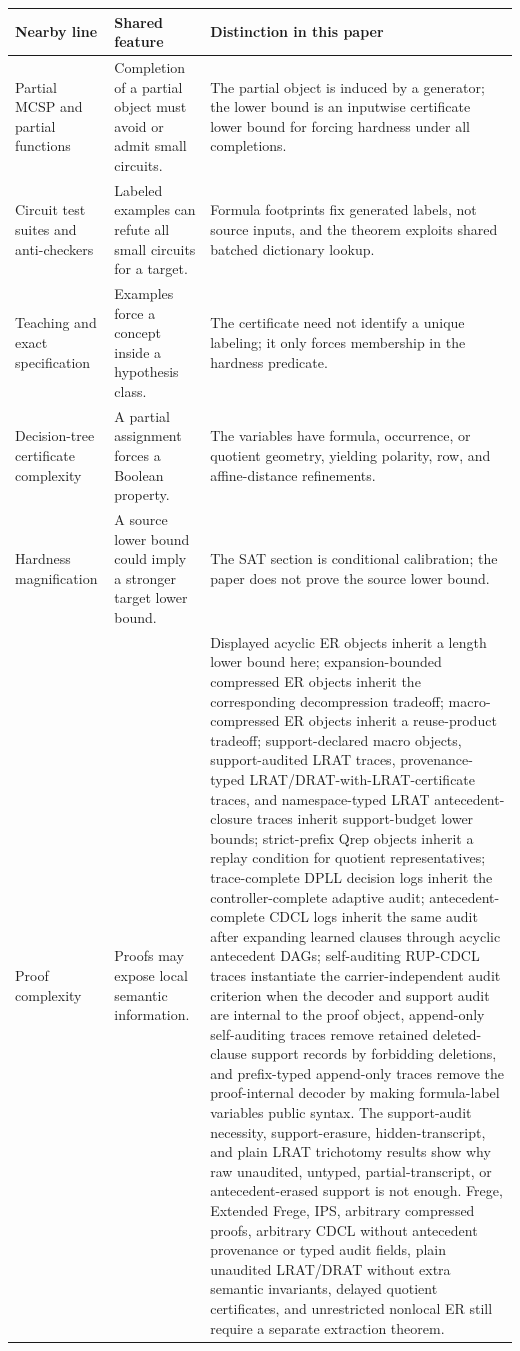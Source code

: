 \documentclass[11pt]{article}
\theoremstyle{definition}
\begin{document}
\begin{table}[htbp]
\centering
\scriptsize
\begin{tabularx}{\textwidth}{@{}p{}p{}X@{}}
\toprule
Nearby line & Shared feature & Distinction in this paper \\
\midrule
Partial MCSP and partial functions & Completion of a partial object must avoid or admit small circuits. & The partial object is induced by a generator; the lower bound is an inputwise certificate lower bound for forcing hardness under all completions. \\
Circuit test suites and anti-checkers & Labeled examples can refute all small circuits for a target. & Formula footprints fix generated labels, not source inputs, and the theorem exploits shared batched dictionary lookup. \\
Teaching and exact specification & Examples force a concept inside a hypothesis class. & The certificate need not identify a unique labeling; it only forces membership in the hardness predicate. \\
Decision-tree certificate complexity & A partial assignment forces a Boolean property. & The variables have formula, occurrence, or quotient geometry, yielding polarity, row, and affine-distance refinements. \\
Hardness magnification & A source lower bound could imply a stronger target lower bound. & The SAT section is conditional calibration; the paper does not prove the source lower bound. \\
Proof complexity & Proofs may expose local semantic information. & Displayed acyclic ER objects inherit a length lower bound here; expansion-bounded compressed ER objects inherit the corresponding decompression tradeoff; macro-compressed ER objects inherit a reuse-product tradeoff; support-declared macro objects, support-audited LRAT traces, provenance-typed LRAT/DRAT-with-LRAT-certificate traces, and namespace-typed LRAT antecedent-closure traces inherit support-budget lower bounds; strict-prefix Qrep objects inherit a replay condition for quotient representatives; trace-complete DPLL decision logs inherit the controller-complete adaptive audit; antecedent-complete CDCL logs inherit the same audit after expanding learned clauses through acyclic antecedent DAGs; self-auditing RUP-CDCL traces instantiate the carrier-independent audit criterion when the decoder and support audit are internal to the proof object, append-only self-auditing traces remove retained deleted-clause support records by forbidding deletions, and prefix-typed append-only traces remove the proof-internal decoder by making formula-label variables public syntax. The support-audit necessity, support-erasure, hidden-transcript, and plain LRAT trichotomy results show why raw unaudited, untyped, partial-transcript, or antecedent-erased support is not enough. Frege, Extended Frege, IPS, arbitrary compressed proofs, arbitrary CDCL without antecedent provenance or typed audit fields, plain unaudited LRAT/DRAT without extra semantic invariants, delayed quotient certificates, and unrestricted nonlocal ER still require a separate extraction theorem. \\

\end{tabularx}
\end{table}
\end{document}
